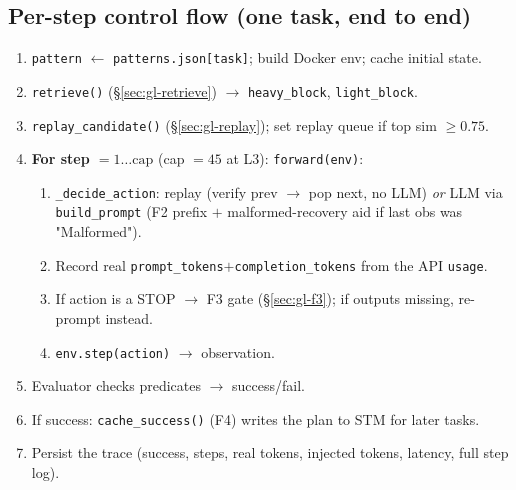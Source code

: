 \subsection{Per-step control flow (one task, end to end)}
\label{sec:gl-loop}
\begin{enumerate}\itemsep1pt
\item \texttt{pattern} $\gets$ \texttt{patterns.json[task]}; build Docker env; cache initial state.
\item \texttt{retrieve()} (\S\ref{sec:gl-retrieve}) $\to$ \texttt{heavy\_block}, \texttt{light\_block}.
\item \texttt{replay\_candidate()} (\S\ref{sec:gl-replay}); set replay queue if top sim $\ge 0.75$.
\item \textbf{For step $=1\ldots\text{cap}$} (cap $=45$ at L3): \texttt{forward(env)}:
  \begin{enumerate}\itemsep0pt
  \item \texttt{\_decide\_action}: replay (verify prev $\to$ pop next, no LLM) \emph{or} LLM via
  \texttt{build\_prompt} (F2 prefix $+$ malformed-recovery aid if last obs was "Malformed").
  \item Record real \texttt{prompt\_tokens}$+$\texttt{completion\_tokens} from the API \texttt{usage}.
  \item If action is a STOP $\to$ F3 gate (\S\ref{sec:gl-f3}); if outputs missing, re-prompt instead.
  \item \texttt{env.step(action)} $\to$ observation.
  \end{enumerate}
\item Evaluator checks predicates $\to$ success/fail.
\item If success: \texttt{cache\_success()} (F4) writes the plan to STM for later tasks.
\item Persist the trace (success, steps, real tokens, injected tokens, latency, full step log).
\end{enumerate}

